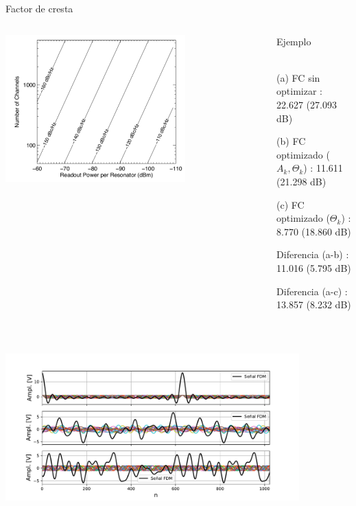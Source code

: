 \documentclass[ignorenonframetext,12pt]{beamer}
\begin{document}
\begin{frame}{Factor de cresta }
				\begin{columns}
								\begin{column}{0.5\textwidth}
												\includegraphics[width=0.7\textwidth]{power_vs_Nchannels2}
								\end{column}
								\begin{column}{0.5\textwidth}{{\color{blue}Ejemplo}}
				\footnotesize{\\(a) FC sin optimizar  : 22.627 (27.093 dB)

											(b)	FC optimizado ($A_k,\Theta_k$)  : 11.611 (21.298 dB)

											(c)	FC optimizado ($\Theta_k$)     : 8.770 (18.860 dB)
											
											Diferencia (a-b)                : 11.016 (5.795 dB)
											
											Diferencia (a-c)                : 13.857 (8.232 dB)}\\
								\end{column}
								\end{columns}
												\includegraphics[width=0.85\textwidth]{in_spectrum_time2}
\end{frame}
\end{document}
